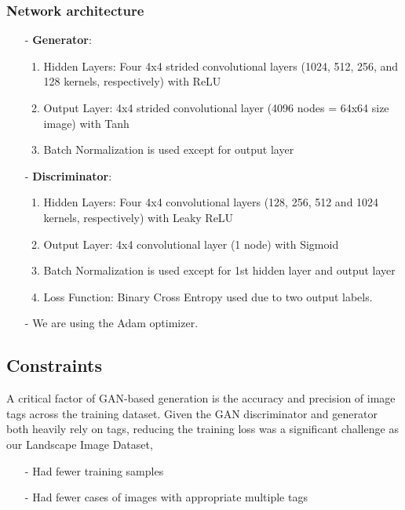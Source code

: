 \documentclass[twocolumn,10pt,cleanfoot]{asme2ej}
\begin{document}
\subsubsection{Network architecture}
\begin{itemize}
    \item[-] \textbf{Generator}:
    \begin{enumerate}
        \item Hidden Layers: Four 4x4 strided convolutional layers (1024, 512, 256, and 128 kernels, respectively) with ReLU
        \item Output Layer: 4x4 strided convolutional layer (4096 nodes = 64x64 size image) with Tanh
        \item Batch Normalization is used except for output layer
    \end{enumerate}

    \item[-] \textbf{Discriminator}:
    \begin{enumerate}
        \item Hidden Layers: Four 4x4 convolutional layers (128, 256, 512 and 1024 kernels, respectively) with Leaky ReLU
        \item Output Layer: 4x4 convolutional layer (1 node) with Sigmoid
        \item Batch Normalization is used except for 1st hidden layer and output layer
        \item Loss Function: Binary Cross Entropy used due to two output labels.
    \end{enumerate}
    \item[-] We are using the Adam optimizer.
\end{itemize}

\subsection{Constraints}
A critical factor of GAN-based generation is the accuracy and precision of image tags across the training dataset. Given the GAN discriminator and generator both heavily rely on tags, reducing the training loss was a significant challenge as our Landscape Image Dataset,
    \begin{itemize}
    \item[-] Had fewer training samples
    \item[-] Had fewer cases of images with appropriate multiple tags
    \end{itemize}
\end{document}
